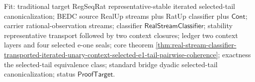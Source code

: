 Fit: traditional target RegSeqRat representative-stable iterated selected-tail
canonicalization; BEDC source RealUp streams plus RatUp classifier plus
$\mathsf{Cont}$; carrier rational-observation streams; classifier
$\mathsf{RealStreamClassifier}$; stability representative transport followed
by two context closures; ledger two context layers and four selected e-one
seals; core theorem
\autoref{thm:real-stream-classifier-transported-iterated-unary-context-selected-e1-tail-pairwise-coherence};
exactness the selected-tail equivalence class; standard bridge dyadic
selected-tail canonicalization; status $\mathsf{ProofTarget}$.
